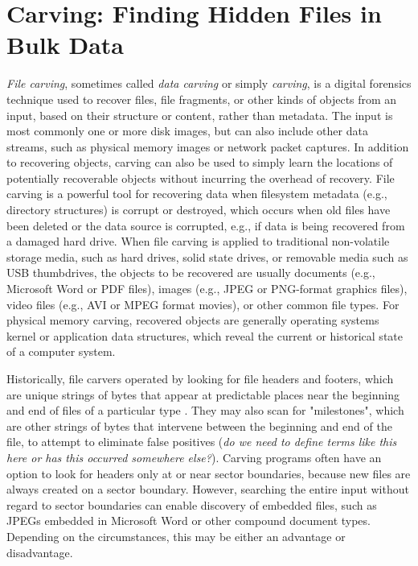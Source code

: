 \chapter{Carving: Finding Hidden Files in Bulk Data}

\emph{File carving}, sometimes called \emph{data carving} or simply \emph{carving}, is a digital forensics technique used to recover files, file fragments, or other kinds of objects from an input, based on their structure or content, rather than metadata.  The input is most commonly one or more disk images, but can also include other data streams, such as physical memory images or network packet captures. In addition to recovering objects, carving can also be used to simply learn the locations of potentially recoverable objects without incurring the overhead of recovery.  File carving is a powerful tool for recovering data when filesystem metadata (e.g., directory structures) is corrupt or destroyed, which occurs when old files have been deleted or the data source is corrupted, e.g., if data is being recovered from a damaged hard drive.  When file carving is applied to traditional non-volatile storage media, such as hard drives, solid state drives, or removable media such as USB thumbdrives, the objects to be recovered are usually documents (e.g., Microsoft Word or PDF files), images (e.g., JPEG or PNG-format graphics files), video files (e.g., AVI or MPEG format movies), or other common file types.  For physical memory carving, recovered objects are generally operating systems kernel or application data structures, which reveal the current or historical state of a computer system.  

Historically, file carvers operated by looking for file headers and footers, which are unique strings of bytes that appear at predictable places near the beginning and end of files of a particular type \cite{Foremost, Scalpel}.  They may also scan for "milestones", which are other strings of bytes that intervene between the beginning and end of the file, to attempt to eliminate false positives (\emph{do we need to define terms like this here or has this occurred somewhere else?}).  Carving programs often have an option to look for headers only at or near sector boundaries, because new files are always created on a sector boundary.  However, searching the entire input without regard to sector boundaries can enable discovery of embedded files, such as JPEGs embedded in Microsoft Word or other compound document types.  Depending on the circumstances, this may be either an advantage or disadvantage.  

